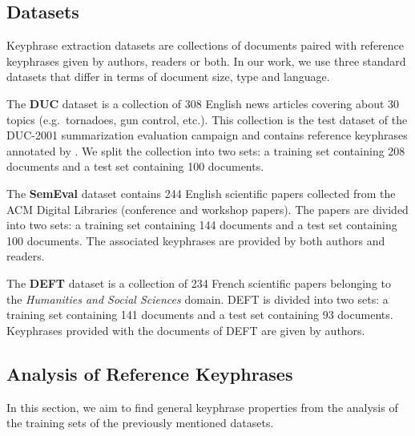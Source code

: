   \subsection{Datasets}
  \label{subsec:keyphrase_extraction_datasets}
    Keyphrase extraction datasets are collections of documents paired with
    reference keyphrases given by authors, readers or both. In our work, we use
    three standard datasets that differ in terms of document size,  type and
    language.

    The \textbf{DUC} dataset \cite{over2001duc} is a collection of 308 English
    news articles covering about 30 topics (e.g.~tornadoes, gun control, etc.).
    This collection is the test dataset of the DUC-2001 summarization evaluation
    campaign and contains reference keyphrases annotated by
    . We split the collection into two sets: a
    training set containing 208 documents and a test set containing 100
    documents.

    The \textbf{SemEval} dataset \cite{kim2010semeval} contains 244 English
    scientific papers collected from the ACM Digital Libraries (conference and
    workshop papers). The papers are divided into two sets: a training set
    containing 144 documents and a test set containing 100 documents. The
    associated keyphrases are provided by both authors and readers.

    The \textbf{DEFT} dataset \cite{Paroubek2012deft} is a collection of 234
    French scientific papers belonging to the \textit{Humanities and Social
    Sciences} domain. DEFT is divided into two sets: a training set containing
    141 documents and a test set containing 93 documents. Keyphrases provided
    with the documents of DEFT are given by authors.

  \subsection{Analysis of Reference Keyphrases}
  \label{subsec:keyphrase_analysis}
    In this section, we aim to find general keyphrase properties from the
    analysis of the training sets of the previously mentioned datasets.

